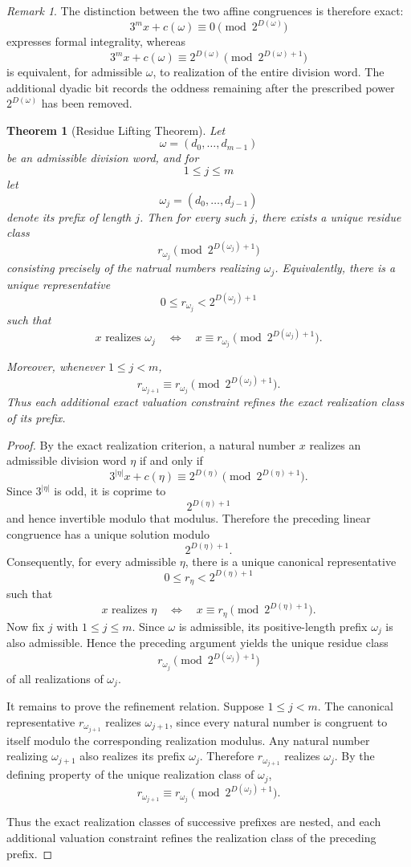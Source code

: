 \documentclass[12pt, oneside]{article}
\numberwithin{equation}{section}
\theoremstyle{definition}
\theoremstyle{plain}
\newtheorem{theorem}{Theorem}[section]
\theoremstyle{remark}
\newtheorem*{remark}{Remark}
\begin{document}
\begin{remark}
The distinction between the two affine congruences is therefore exact:
\[
3^m x+c(\omega)\equiv0\pmod{2^{D(\omega)}}
\]
expresses formal integrality, whereas
\[
3^m x+c(\omega) \equiv2^{D(\omega)} \pmod{2^{D(\omega)+1}}
\]
is equivalent, for admissible \(\omega\), to realization of the entire
division word. The additional dyadic bit records the oddness remaining
after the prescribed power \(2^{D(\omega)}\) has been removed.
\end{remark}

\begin{theorem}[Residue Lifting Theorem]
\label{thm:residue-lifting-theorem}
Let
\[
\omega=(d_0,\dots,d_{m-1})
\]
be an admissible division word, and for
\[
1\le j\le m
\]
let
\[
\omega_j=(d_0,\dots,d_{j-1})
\]
denote its prefix of length \(j\). Then for every such \(j\), there exists
a unique residue class
\[
r_{\omega_j} \pmod{2^{D(\omega_j)+1}}
\]
consisting precisely of the natrual numbers realizing \(\omega_j\).
Equivalently, there is a unique representative
\[
0\le r_{\omega_j}<2^{D(\omega_j)+1}
\]
such that
\[
x \text{ realizes } \omega_j
\quad\Longleftrightarrow\quad
x\equiv r_{\omega_j} \pmod{2^{D(\omega_j)+1}}.
\]

Moreover, whenever \(1\le j<m\),
\[
r_{\omega_{j+1}} \equiv r_{\omega_j} \pmod{2^{D(\omega_j)+1}}.
\]
Thus each additional exact valuation constraint refines the exact
realization class of its prefix.
\end{theorem}

\begin{proof}
By the exact realization criterion, a natural number \(x\) realizes an
admissible division word \(\eta\) if and only if
\[
3^{|\eta|}x+c(\eta) \equiv 2^{D(\eta)} \pmod{2^{D(\eta)+1}}.
\]
Since \(3^{|\eta|}\) is odd, it is coprime to
\[
2^{D(\eta)+1}
\]
and hence invertible modulo that modulus. Therefore the preceding linear
congruence has a unique solution modulo
\[
2^{D(\eta)+1}.
\]
Consequently, for every admissible \(\eta\), there is a unique canonical
representative
\[
0\le r_\eta<2^{D(\eta)+1}
\]
such that
\[
x\text{ realizes }\eta
\quad\Longleftrightarrow\quad
x\equiv r_\eta \pmod{2^{D(\eta)+1}}.
\]
Now fix \(j\) with \(1\le j\le m\). Since \(\omega\) is admissible, its
positive-length prefix \(\omega_j\) is also admissible. Hence the preceding
argument yields the unique residue class
\[
r_{\omega_j} \pmod{2^{D(\omega_j)+1}}
\]
of all realizations of \(\omega_j\).

It remains to prove the refinement relation. Suppose \(1\le j<m\).
The canonical representative \(r_{\omega_{j+1}}\) realizes
\(\omega_{j+1}\), since every natural number is congruent to itself modulo the
corresponding realization modulus. Any natural number realizing
\(\omega_{j+1}\) also realizes its prefix \(\omega_j\). Therefore
\(r_{\omega_{j+1}}\) realizes \(\omega_j\). By the defining property of
the unique realization class of \(\omega_j\),
\[
r_{\omega_{j+1}} \equiv r_{\omega_j} \pmod{2^{D(\omega_j)+1}}.
\]

Thus the exact realization classes of successive prefixes are nested, and
each additional valuation constraint refines the realization class of the
preceding prefix.
\end{proof}
\end{document}
